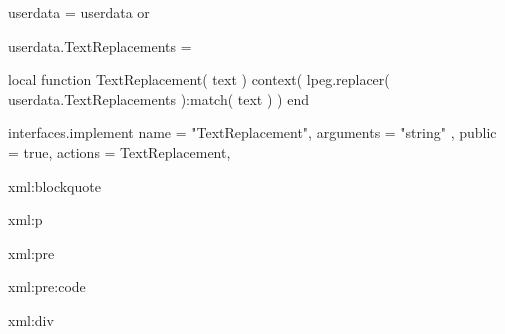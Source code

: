 %
%

\startluacode
userdata = userdata or {}

userdata.TextReplacements = {}

local function TextReplacement( text )
  context( lpeg.replacer( userdata.TextReplacements ):match( text ) )
end

interfaces.implement {
  name      = "TextReplacement",
  arguments = { "string" },
  public    = true,
  actions   = TextReplacement,
}
\stopluacode

\startxmlsetups xml:blockquote
  \startblockquote
  \stopblockquote
\stopxmlsetups

\startxmlsetups xml:p
   {
    \ignorespaces
    \expandafter{}
    \removeunwantedspaces
  }
  \par
\stopxmlsetups


\startxmlsetups xml:pre
  \startxmldisplayverbatim
  \stopxmldisplayverbatim
\stopxmlsetups

\startxmlsetups xml:pre:code
  \startxmldisplayverbatim
  \stopxmldisplayverbatim
\stopxmlsetups

\startxmlsetups xml:div
  \stop
\stopxmlsetups

